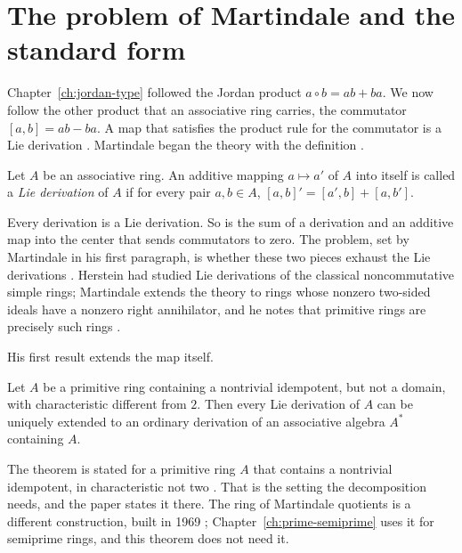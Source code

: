 \section{The problem of Martindale and the standard form}\label{sec:lie-type:martindale}

Chapter~\ref{ch:jordan-type} followed the Jordan product $a\circ b=ab+ba$. We now follow
the other product that an associative ring carries, the commutator $[a,b]=ab-ba$. A map
that satisfies the product rule for the commutator is a Lie derivation \cite[p.~183]{Martindale1964}.
Martindale began the theory with the definition \cite[p.~183]{Martindale1964}.

\begin{definition}\label{def:lie:martindale}
Let $A$ be an associative ring. An additive mapping $a\mapsto a'$ of $A$ into itself is
called a \emph{Lie derivation} of $A$ if for every pair $a,b\in A$,
$[a,b]'=[a',b]+[a,b']$.
\end{definition}

Every derivation is a Lie derivation. %
So is the sum of a derivation and an additive map into the center that sends
commutators to zero. The problem, set by Martindale in his first paragraph, is
whether these two pieces exhaust the Lie derivations \cite[p.~183]{Martindale1964}.
Herstein had studied Lie derivations of the classical noncommutative simple rings; Martindale
extends the theory to rings whose nonzero two-sided ideals have a nonzero right
annihilator, and he notes that primitive rings are precisely such rings
\cite[p.~183]{Martindale1964}.

His first result extends the map itself. %

\begin{theorem}\label{thm:lie:martindale-extension}
Let $A$ be a primitive ring containing a nontrivial idempotent, but not a domain, with
characteristic different from $2$. Then every Lie derivation of $A$ can be uniquely
extended to an ordinary derivation of an associative algebra $A^{\ast}$ containing $A$.
\end{theorem}

The theorem is stated for a primitive ring $A$ that contains a nontrivial
idempotent, in characteristic not two \cite[pp.~183--184]{Martindale1964}. That
is the setting the decomposition needs, and the paper states it there.
The ring of Martindale quotients is a different construction, built in 1969
\cite[p.~576]{Martindale1969}; Chapter~\ref{ch:prime-semiprime} uses it for
semiprime rings, and this theorem does not need it. %

